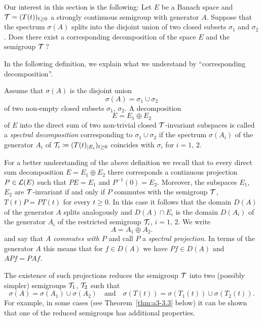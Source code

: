 Our interest in this section is the following: Let $E$ be a Banach space and $\mathcal{T} = (T(t))_{t \geq 0}$ a strongly continuous semigroup with generator $A$.
Suppose that the spectrum $\sigma(A)$ splits into the disjoint union of two closed subsets $\sigma_{1}$ and $\sigma_{2}$.
Does there exist a corresponding decomposition of the space $E$ and the semigroup $\mathcal{T}$\,?

In the following definition, we explain what we understand by \enquote{corresponding decomposition}.

\phantom{x}
\begin{definition}\label{def:a3-3.1}
Assume that $\sigma(A)$ is the disjoint union
\[
\sigma(A) = \sigma_{1} \cup \sigma_{2}
\]
of two non-empty closed subsets $\sigma_{1}$, $\sigma_{2}$.
A decomposition
\[
E = E_{1} \oplus E_{2}
\]
of $E$ into the direct sum of two non-trivial closed $\mathcal{T}$-invariant subspaces is called a \emph{spectral decomposition} corresponding to $\sigma_{1} \cup \sigma_{2}$ if the spectrum $\sigma(A_{i})$ of the generator $A_{i}$ of $\mathcal{T}_{i} \coloneqq (T(t)_{|E_{i}})_{t \geq 0}$ coincides with $\sigma_{i}$ for $i = 1$, $2$.
\end{definition}
For a better understanding of the above definition we recall that to every direct sum decomposition $E = E_{1} \oplus E_{2}$ there corresponds a continuous projection $P \in \mathcal{L}(E)$ such that $PE = E_{1}$ and $P^{-1}(0) = E_{2}$.
Moreover, the subspaces $E_{1}$, $E_{2}$ are $\mathcal{T}$-invariant if and only if $P$ commutes with the semigroup $\mathcal{T}$, \ie $T(t)P = PT(t)$ for every $t \geq 0$.
In this case it follows that the domain $D(A)$ of the generator $A$ splits analogously and $D(A) \cap E_{i}$ is the domain $D(A_{i})$ of the generator $A_{i}$ of the restricted semigroup $\mathcal{T}_{i}$, $i = 1$, $2$.
We write
\[
A = A_{1} \oplus A_{2} .
\]
and say that \emph{$A$ commutes with $P$} and call $P$ a \emph{spectral projection}.
In terms of the generator $A$ this means that for $f \in D(A)$ we have $Pf \in D(A)$ and $APf = PAf$.

The existence of such projections reduces the semigroup $\mathcal{T}$ into two (possibly simpler) semigroups $\mathcal{T}_{1}$, $\mathcal{T}_{2}$ such that
\[
\sigma(A) = \sigma(A_{1}) \cup \sigma(A_{2}) \quad \text{and} \quad \sigma(T(t)) = \sigma(T_{1}(t)) \cup \sigma(T_{2}(t)) .
\]
For example, in some cases (see Theorem~\ref{thm:a3-3.3} below) it can be shown that one of the reduced semigroups has additional properties.

